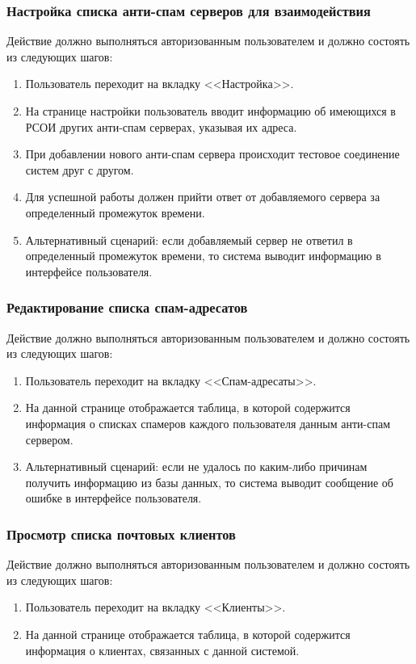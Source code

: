 \subsubsection*{Настройка списка анти-спам серверов для взаимодействия}
Действие должно выполняться авторизованным пользователем и должно состоять из следующих шагов:
\begin{enumerate}
  \item Пользователь переходит на вкладку <<Настройка>>.
  \item На странице настройки пользователь вводит информацию об имеющихся в РСОИ других анти-спам серверах, указывая их адреса.
  \item При добавлении нового анти-спам сервера происходит тестовое соединение систем друг с другом.
  \item Для успешной работы должен прийти ответ от добавляемого сервера за определенный промежуток времени.
  \item Альтернативный сценарий: если добавляемый сервер не ответил в определенный промежуток времени, то система выводит информацию в интерфейсе пользователя.
\end{enumerate}

\subsubsection*{Редактирование списка спам-адресатов}
Действие должно выполняться авторизованным пользователем и должно состоять из следующих шагов:
\begin{enumerate}
  \item Пользователь переходит на вкладку <<Спам-адресаты>>.
  \item На данной странице отображается таблица, в которой содержится информация о списках спамеров каждого пользователя данным анти-спам сервером.
  \item Альтернативный сценарий: если не удалось по каким-либо причинам получить информацию из базы данных, то система выводит сообщение об ошибке в интерфейсе пользователя.
\end{enumerate}

\subsubsection*{Просмотр списка почтовых клиентов}
Действие должно выполняться авторизованным пользователем и должно состоять из следующих шагов:
\begin{enumerate}
  \item Пользователь переходит на вкладку <<Клиенты>>.
  \item На данной странице отображается таблица, в которой содержится информация о клиентах, связанных с данной системой.
\end{enumerate}

